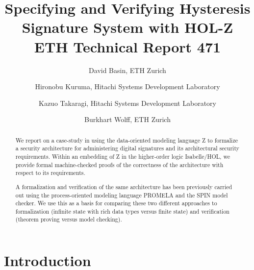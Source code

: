 \documentclass[a4paper,pdftex]{article}
\title{Specifying and Verifying Hysteresis Signature System with HOL-Z\\ 
       ETH Technical Report 471}
\author{David Basin, ETH Zurich     \and
     Hironobu Kuruma, Hitachi Systems Development Laboratory  \and
     Kazuo Takaragi, Hitachi Systems Development Laboratory  \and 
     Burkhart Wolff, ETH Zurich}
\begin{document}
\pagestyle{plain} %
\maketitle 
\begin{abstract}
  We report on a case-study in using the data-oriented modeling language Z
  to formalize a security architecture for administering digital
  signatures and its architectural security requirements.  Within an embedding
  of Z in the higher-order logic Isabelle/HOL, we provide formal
  machine-checked proofs of the correctness of the architecture with
  respect to its requirements.  

  A formalization and verification of the same architecture has been
  previously carried out using the process-oriented modeling language
  PROMELA and the SPIN model checker.  We use this as a basis for
  comparing these two different approaches to formalization (infinite
  state with rich data types versus finite state) and verification
  (theorem proving versus model checking).
\end{abstract}
\clearpage{}
\tableofcontents 
{}


\clearpage{}
\section{Introduction}
\end{document}
